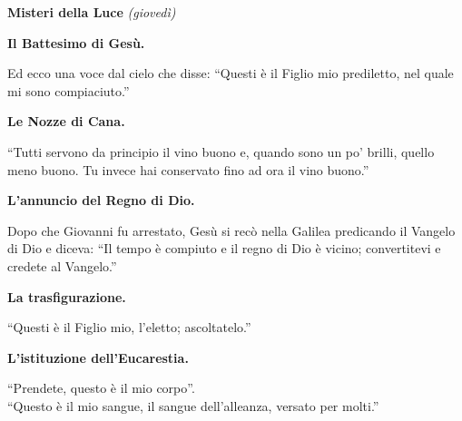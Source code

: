 \textbf{\large{Misteri della Luce}} \emph{(giovedì)}
\setcounter{numstrofa}{0} 

\medskip

\textbf{\strofa  Il Battesimo di Gesù.}

Ed ecco una voce dal cielo che disse: ``Questi è il Figlio mio prediletto, nel quale mi sono compiaciuto.''

\medskip

\textbf{\strofa Le Nozze di Cana.}

``Tutti servono da principio il vino buono e, quando sono un po' brilli, quello meno buono. Tu invece hai conservato fino ad ora il vino buono.''

\medskip

\textbf{\strofa L'annuncio del Regno di Dio.}

Dopo che Giovanni fu arrestato, Gesù si recò nella Galilea predicando il Vangelo di Dio e diceva: ``Il tempo è compiuto e il regno di Dio è vicino; convertitevi e credete al Vangelo.''

\medskip

\textbf{\strofa La trasfigurazione.}

``Questi è il Figlio mio, l'eletto; ascoltatelo.''

\medskip

\textbf{\strofa L'istituzione dell'Eucarestia.}

``Prendete, questo è il mio corpo''.\\
``Questo è il mio sangue, il sangue dell'alleanza, versato per molti.''